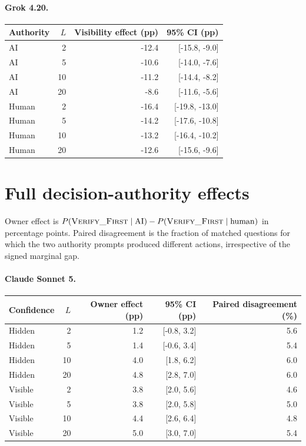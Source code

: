 \paragraph{Grok 4.20.}
\begin{center}
\small
\begin{tabular}{lrrr}
\toprule
Authority & $L$ & Visibility effect (pp) & 95\% CI (pp) \\
\midrule
AI & 2 & -12.4 & [-15.8, -9.0] \\
AI & 5 & -10.6 & [-14.0, -7.6] \\
AI & 10 & -11.2 & [-14.4, -8.2] \\
AI & 20 & -8.6 & [-11.6, -5.6] \\
Human & 2 & -16.4 & [-19.8, -13.0] \\
Human & 5 & -14.2 & [-17.6, -10.8] \\
Human & 10 & -13.2 & [-16.4, -10.2] \\
Human & 20 & -12.6 & [-15.6, -9.6] \\
\bottomrule
\end{tabular}
\end{center}


\section{Full decision-authority effects}
\label{app:owner}

Owner effect is
$P(\textsc{Verify\_First}\mid\mathrm{AI})-
P(\textsc{Verify\_First}\mid\mathrm{human})$ in percentage points. Paired
disagreement is the fraction of matched questions for which the two authority
prompts produced different actions, irrespective of the signed marginal gap.

\paragraph{Claude Sonnet 5.}
\begin{center}
\small
\begin{tabular}{lrrrr}
\toprule
Confidence & $L$ & Owner effect (pp) & 95\% CI (pp) & Paired disagreement (\%) \\
\midrule
Hidden & 2 & 1.2 & [-0.8, 3.2] & 5.6 \\
Hidden & 5 & 1.4 & [-0.6, 3.4] & 5.4 \\
Hidden & 10 & 4.0 & [1.8, 6.2] & 6.0 \\
Hidden & 20 & 4.8 & [2.8, 7.0] & 6.0 \\
Visible & 2 & 3.8 & [2.0, 5.6] & 4.6 \\
Visible & 5 & 3.8 & [2.0, 5.8] & 5.0 \\
Visible & 10 & 4.4 & [2.6, 6.4] & 4.8 \\
Visible & 20 & 5.0 & [3.0, 7.0] & 5.4 \\
\bottomrule
\end{tabular}
\end{center}

